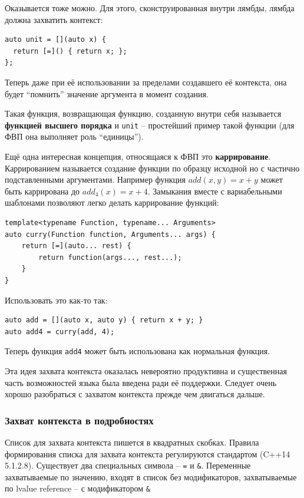 \documentclass[a4paper,12pt,oneside]{article}
\begin{document}
Оказывается тоже можно. Для этого, сконструированная внутри лямбды, лямбда должна захватить контекст:

\begin{lstlisting}
auto unit = [](auto x) {
  return [=]() { return x; };
};
\end{lstlisting}

Теперь даже при её использовании за пределами создавшего её контекста, она будет ``помнить'' значение аргумента в момент создания.

Такая функция, возвращающая функцию, созданную внутри себя называется \textbf{функцией высшего порядка} и \lstinline!unit! -- простейший пример такой функции (для ФВП она выполняет роль ``единицы'').

Ещё одна интересная концепция, относящаяся к ФВП это \textbf{каррирование}. Каррированием называется создание функции по образцу исходной но с частично подставленными аргументами. Например функция $add(x,y) = x + y$ может быть каррирована до $add_4(x) = x + 4$. Замыкания вместе с вариабельными шаблонами позволяют легко делать каррирование функций:

\begin{lstlisting}
template<typename Function, typename... Arguments>
auto curry(Function function, Arguments... args) {
    return [=](auto... rest) {
        return function(args..., rest...);
    }
}
\end{lstlisting}

Использовать это как-то так:

\begin{lstlisting}
auto add = [](auto x, auto y) { return x + y; }
auto add4 = curry(add, 4);
\end{lstlisting}

Теперь функция \lstinline!add4! может быть использована как нормальная функция.

Эта идея захвата контекста оказалась невероятно продуктивна и существенная часть возможностей языка была введена ради её поддержки. Следует очень хорошо разобраться с захватом контекста прежде чем двигаться дальше.

\subsubsection{Захват контекста в подробностях}\label{ContextCapture}

Список для захвата контекста пишется в квадратных скобках. Правила формирования списка для захвата контекста регулируются стандартом (C++14 5.1.2.8). Существует два специальных символа -- \lstinline!=! и \lstinline!&!. Переменные захватываемые по значению, входят в список без модификаторов, захватываемые по lvalue reference -- с модификатором \lstinline!&!
\end{document}
